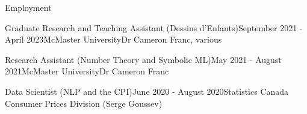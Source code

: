 \begin{rSection}{Employment}



\begin{rSubsection}{Graduate Research and Teaching Assistant (Dessins d'Enfants)}{September 2021 - April 2023}{McMaster University}{Dr Cameron Franc, various}
\end{rSubsection}

\begin{rSubsection}{Research Assistant (Number Theory and Symbolic ML)}{May 2021 - August 2021}{McMaster University}{Dr Cameron Franc}
\end{rSubsection}

\begin{rSubsection}{Data Scientist (NLP and the CPI)}{June 2020 - August 2020}{Statistics Canada }{Consumer Prices Division (Serge Goussev)}
\end{rSubsection}


\end{rSection}

